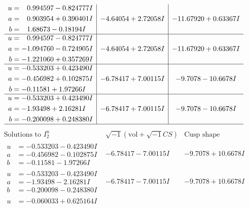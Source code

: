 \documentclass[1p]{elsarticle_modified}
\theoremstyle{definition}
\newcommand{\I}{\sqrt{-1}}
\begin{document}
$$\begin{array}{c|c|c}
\begin{aligned}
u &= \phantom{-}0.994597 - 0.824777 I \\
a &= \phantom{-}0.903954 + 0.390401 I \\
b &= \phantom{-}1.68673 - 0.18194 I\end{aligned}
 & -4.64054 + 2.72058 I & -11.67920 + 0.63367 I \\ \hline\begin{aligned}
u &= \phantom{-}0.994597 - 0.824777 I \\
a &= -1.094760 - 0.724905 I \\
b &= -1.221060 + 0.357269 I\end{aligned}
 & -4.64054 + 2.72058 I & -11.67920 + 0.63367 I \\ \hline\begin{aligned}
u &= -0.533203 + 0.423490 I \\
a &= -0.456982 + 0.102875 I \\
b &= -0.11581 + 1.97266 I\end{aligned}
 & -6.78417 + 7.00115 I & -9.7078 - 10.6678 I \\ \hline\begin{aligned}
u &= -0.533203 + 0.423490 I \\
a &= -1.93498 + 2.16281 I \\
b &= -0.200098 + 0.248380 I\end{aligned}
 & -6.78417 + 7.00115 I & -9.7078 - 10.6678 I\\
 \hline 
 \end{array}$$\newpage$$\begin{array}{c|c|c}  
\text{Solutions to }I^u_{2}& \I (\text{vol} + \sqrt{-1}CS) & \text{Cusp shape}\\
 \hline 
\begin{aligned}
u &= -0.533203 - 0.423490 I \\
a &= -0.456982 - 0.102875 I \\
b &= -0.11581 - 1.97266 I\end{aligned}
 & -6.78417 - 7.00115 I & -9.7078 + 10.6678 I \\ \hline\begin{aligned}
u &= -0.533203 - 0.423490 I \\
a &= -1.93498 - 2.16281 I \\
b &= -0.200098 - 0.248380 I\end{aligned}
 & -6.78417 - 7.00115 I & -9.7078 + 10.6678 I \\ \hline\begin{aligned}
u &= -0.060033 + 0.625164 I \\

\end{aligned}
\end{array}$$
\end{document}
